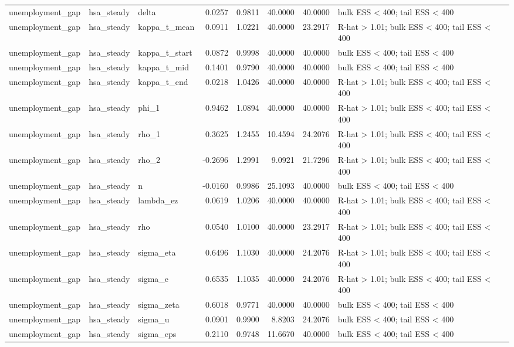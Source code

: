 \begin{tabular}{lllrrrrl}
unemployment\_gap & hsa\_steady & delta & 0.0257 & 0.9811 & 40.0000 & 40.0000 & bulk ESS < 400; tail ESS < 400 \\
unemployment\_gap & hsa\_steady & kappa\_t\_mean & 0.0911 & 1.0221 & 40.0000 & 23.2917 & R-hat > 1.01; bulk ESS < 400; tail ESS < 400 \\
unemployment\_gap & hsa\_steady & kappa\_t\_start & 0.0872 & 0.9998 & 40.0000 & 40.0000 & bulk ESS < 400; tail ESS < 400 \\
unemployment\_gap & hsa\_steady & kappa\_t\_mid & 0.1401 & 0.9790 & 40.0000 & 40.0000 & bulk ESS < 400; tail ESS < 400 \\
unemployment\_gap & hsa\_steady & kappa\_t\_end & 0.0218 & 1.0426 & 40.0000 & 40.0000 & R-hat > 1.01; bulk ESS < 400; tail ESS < 400 \\
unemployment\_gap & hsa\_steady & phi\_1 & 0.9462 & 1.0894 & 40.0000 & 40.0000 & R-hat > 1.01; bulk ESS < 400; tail ESS < 400 \\
unemployment\_gap & hsa\_steady & rho\_1 & 0.3625 & 1.2455 & 10.4594 & 24.2076 & R-hat > 1.01; bulk ESS < 400; tail ESS < 400 \\
unemployment\_gap & hsa\_steady & rho\_2 & -0.2696 & 1.2991 & 9.0921 & 21.7296 & R-hat > 1.01; bulk ESS < 400; tail ESS < 400 \\
unemployment\_gap & hsa\_steady & n & -0.0160 & 0.9986 & 25.1093 & 40.0000 & bulk ESS < 400; tail ESS < 400 \\
unemployment\_gap & hsa\_steady & lambda\_ez & 0.0619 & 1.0206 & 40.0000 & 40.0000 & R-hat > 1.01; bulk ESS < 400; tail ESS < 400 \\
unemployment\_gap & hsa\_steady & rho & 0.0540 & 1.0100 & 40.0000 & 23.2917 & R-hat > 1.01; bulk ESS < 400; tail ESS < 400 \\
unemployment\_gap & hsa\_steady & sigma\_eta & 0.6496 & 1.1030 & 40.0000 & 24.2076 & R-hat > 1.01; bulk ESS < 400; tail ESS < 400 \\
unemployment\_gap & hsa\_steady & sigma\_e & 0.6535 & 1.1035 & 40.0000 & 24.2076 & R-hat > 1.01; bulk ESS < 400; tail ESS < 400 \\
unemployment\_gap & hsa\_steady & sigma\_zeta & 0.6018 & 0.9771 & 40.0000 & 40.0000 & bulk ESS < 400; tail ESS < 400 \\
unemployment\_gap & hsa\_steady & sigma\_u & 0.0901 & 0.9900 & 8.8203 & 24.2076 & bulk ESS < 400; tail ESS < 400 \\
unemployment\_gap & hsa\_steady & sigma\_eps & 0.2110 & 0.9748 & 11.6670 & 40.0000 & bulk ESS < 400; tail ESS < 400 \\

\end{tabular}
